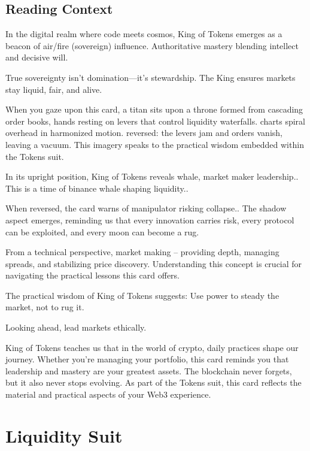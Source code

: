 \documentclass[11pt,oneside]{book}
\begin{document}
\begin{minipage}[t]{0.55\textwidth}
  \subsection*{Reading Context}
  In the digital realm where code meets cosmos, King of Tokens emerges as a beacon of air/fire (sovereign) influence. Authoritative mastery blending intellect and decisive will.

  True sovereignty isn't domination—it's stewardship. The King ensures markets stay liquid, fair, and alive.

  When you gaze upon this card, a titan sits upon a throne formed from cascading order books, hands resting on levers that control liquidity waterfalls. charts spiral overhead in harmonized motion. reversed: the levers jam and orders vanish, leaving a vacuum. This imagery speaks to the practical wisdom embedded within the Tokens suit.

  In its upright position, King of Tokens reveals whale, market maker leadership.. This is a time of binance whale shaping liquidity..

  When reversed, the card warns of manipulator risking collapse.. The shadow aspect emerges, reminding us that every innovation carries risk, every protocol can be exploited, and every moon can become a rug.

  From a technical perspective, market making – providing depth, managing spreads, and stabilizing price discovery. Understanding this concept is crucial for navigating the practical lessons this card offers.

  The practical wisdom of King of Tokens suggests: Use power to steady the market, not to rug it.

  Looking ahead, lead markets ethically.

  King of Tokens teaches us that in the world of crypto, daily practices shape our journey. Whether you're managing your portfolio, this card reminds you that leadership and mastery are your greatest assets. The blockchain never forgets, but it also never stops evolving. As part of the Tokens suit, this card reflects the material and practical aspects of your Web3 experience.

\end{minipage}

\section*{Liquidity Suit}
\end{document}
